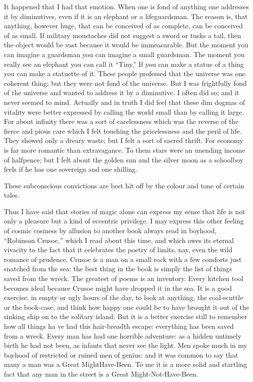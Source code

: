 \documentclass{book}
\begin{document}
It happened that I had that emotion. When one is fond of anything one addresses it by diminutives, even if it is an elephant or a lifeguardsman. The reason is, that anything, however huge, that can be conceived of as complete, can be conceived of as small. If military moustaches did not suggest a sword or tusks a tail, then the object would be vast because it would be immeasurable. But the moment you can imagine a guardsman you can imagine a small guardsman. The moment you really see an elephant you can call it “Tiny.” If you can make a statue of a thing you can make a statuette of it. These people professed that the universe was one coherent thing; but they were not fond of the universe. But I was frightfully fond of the universe and wanted to address it by a diminutive. I often did so; and it never seemed to mind. Actually and in truth I did feel that these dim dogmas of vitality were better expressed by calling the world small than by calling it large. For about infinity there was a sort of carelessness which was the reverse of the fierce and pious care which I felt touching the pricelessness and the peril of life. They showed only a dreary waste; but I felt a sort of sacred thrift. For economy is far more romantic than extravagance. To them stars were an unending income of halfpence; but I felt about the golden sun and the silver moon as a schoolboy feels if he has one sovereign and one shilling.

These subconscious convictions are best hit off by the colour and tone of certain tales.

Thus I have said that stories of magic alone can express my sense that life is not only a pleasure but a kind of eccentric privilege. I may express this other feeling of cosmic cosiness by allusion to another book always read in boyhood, “Robinson Crusoe,” which I read about this time, and which owes its eternal vivacity to the fact that it celebrates the poetry of limits, nay, even the wild romance of prudence. Crusoe is a man on a small rock with a few comforts just snatched from the sea: the best thing in the book is simply the list of things saved from the wreck. The greatest of poems is an inventory. Every kitchen tool becomes ideal because Crusoe might have dropped it in the sea. It is a good exercise, in empty or ugly hours of the day, to look at anything, the coal-scuttle or the book-case, and think how happy one could be to have brought it out of the sinking ship on to the solitary island. But it is a better exercise still to remember how all things ha ve had this hair-breadth escape: everything has been saved from a wreck. Every man has had one horrible adventure: as a hidden untimely birth he had not been, as infants that never see the light. Men spoke much in my boyhood of restricted or ruined men of genius: and it was common to say that many a man was a Great MightHave-Been. To me it is a more solid and startling fact that any man in the street is a Great Might-Not-Have-Been.
\end{document}
